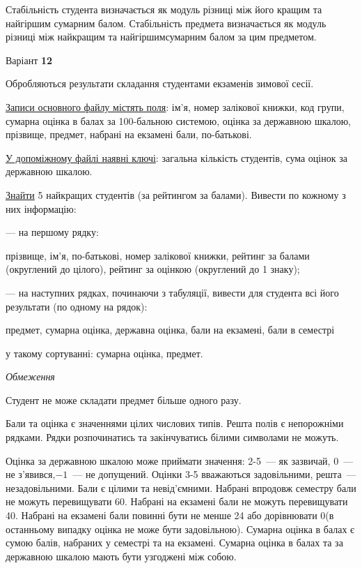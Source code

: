 \documentclass[11pt, ukrainian]{article}
\begin{document}
Стабільність студента визначається як модуль різниці між його кращим та найгіршим сумарним балом.
Стабільність предмета визначається як модуль різниці між найкращим та найгіршимсумарним балом за цим предметом.




\par
\newpage
{\center Варіант  \No \textbf { 12 }\par}
\bigskip
Обробляються результати складання студентами екзаменів зимової сесії.

\underline{Записи основного файлу містять поля}: ім’я, номер залікової книжки, код групи, сумарна оцінка в балах за 100-бальною системою, оцінка за державною шкалою, прізвище, предмет, набрані на екзамені бали, по-батькові.

\underline{У допоміжному файлі наявні ключі}: загальна кількість студентів, сума оцінок за державною шкалою.

\underline{Знайти} 5 найкращих студентів (за рейтингом за балами). Вивести по кожному з них інформацію:\par
{\noindent}--- на першому рядку:\par
прізвище, ім’я, по-батькові, номер залікової книжки, рейтинг за балами (округлений до цілого), рейтинг за оцінкою (округлений до 1 знаку);

{\noindent}--- на наступних рядках, починаючи з табуляції, вивести для студента всі його результати (по одному на рядок):\par
предмет, сумарна оцінка, державна оцінка, бали на екзамені, бали в семестрі

{\noindent}у такому сортуванні: сумарна оцінка, предмет.


\bigskip\textit{Обмеження}

Студент не може складати предмет більше одного разу.

Бали та оцінка є значеннями цілих числових типів. Решта полів є непорожніми рядками.
Рядки розпочинатись та закінчуватись білими символами не можуть.

Оцінка за державною шкалою може приймати значення: 2-5~--- як зазвичай, 0~--- не з’явився,$-1$~--- не допущений. 
Оцінки 3-5 вважаються задовільними, решта~--- незадовільними. 
Бали є цілими та невід’ємними.
Набрані впродовж семестру бали не можуть перевищувати 60. 
Набрані на екзамені бали не можуть перевищувати 40. 
Набрані на екзамені бали повинні бути не менше 24 або дорівнювати 0(в останньому випадку оцінка не може бути задовільною). 
Сумарна оцінка в балах є сумою балів, набраних у семестрі та на екзамені.
Сумарна оцінка в балах та за державною шкалою мають бути узгоджені між собою.
\end{document}
